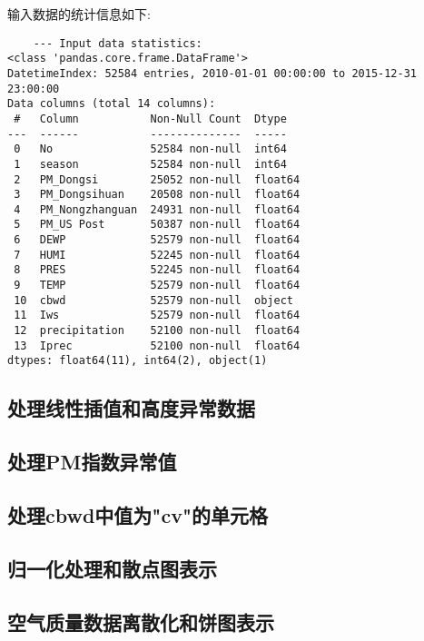 输入数据的统计信息如下:
\begin{lstlisting}
    --- Input data statistics:
<class 'pandas.core.frame.DataFrame'>
DatetimeIndex: 52584 entries, 2010-01-01 00:00:00 to 2015-12-31 23:00:00
Data columns (total 14 columns):
 #   Column           Non-Null Count  Dtype
---  ------           --------------  -----
 0   No               52584 non-null  int64
 1   season           52584 non-null  int64
 2   PM_Dongsi        25052 non-null  float64
 3   PM_Dongsihuan    20508 non-null  float64
 4   PM_Nongzhanguan  24931 non-null  float64
 5   PM_US Post       50387 non-null  float64
 6   DEWP             52579 non-null  float64
 7   HUMI             52245 non-null  float64
 8   PRES             52245 non-null  float64
 9   TEMP             52579 non-null  float64
 10  cbwd             52579 non-null  object
 11  Iws              52579 non-null  float64
 12  precipitation    52100 non-null  float64
 13  Iprec            52100 non-null  float64
dtypes: float64(11), int64(2), object(1)
\end{lstlisting}

\subsection{处理线性插值和高度异常数据}


\subsection{处理PM指数异常值}


\subsection{处理cbwd中值为"cv"的单元格}


\subsection{归一化处理和散点图表示}


\subsection{空气质量数据离散化和饼图表示}
